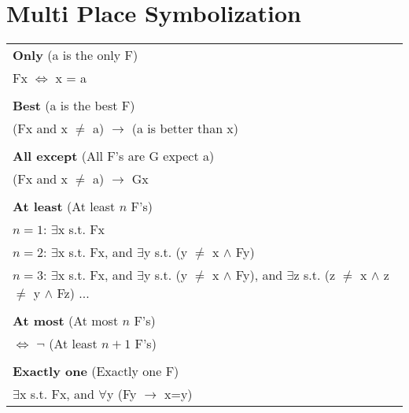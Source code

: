 \documentclass{article}
\begin{document}
\section{Multi Place Symbolization}
\begin{tabular}{l}
\textbf{Only} (a is the only F)\\
Fx $\Longleftrightarrow$ x = a\\
\\
\textbf{Best} (a is the best F)\\
(Fx and x $\ne$ a) $ \to$ (a is better than x)\\
\\
\textbf{All except} (All F's are G expect a)\\
(Fx and x $\ne$ a) $ \to$ Gx\\
\\
\textbf{At least} (At least $n$ F's)\\
$n=1$: $\exists$x  s.t. Fx\\
$n=2$: $\exists$x  s.t. Fx, and $\exists$y s.t. (y $\ne$ x $\wedge$ Fy)\\
$n=3$: $\exists$x  s.t. Fx, and $\exists$y s.t. (y $\ne$ x $\wedge$ Fy), and $\exists$z s.t. (z $\ne$ x $\wedge$ z $\ne$ y $\wedge$ Fz) ... \\
\\
\textbf{At most} (At most $n$ F's)\\
$\Longleftrightarrow$  $\neg$ (At least $n+1$ F's)\\
\\
\textbf{Exactly one} (Exactly one F)\\
$\exists$x s.t. Fx, and $\forall$y (Fy $ \to$ x=y)\\
\end{tabular}
\end{document}

